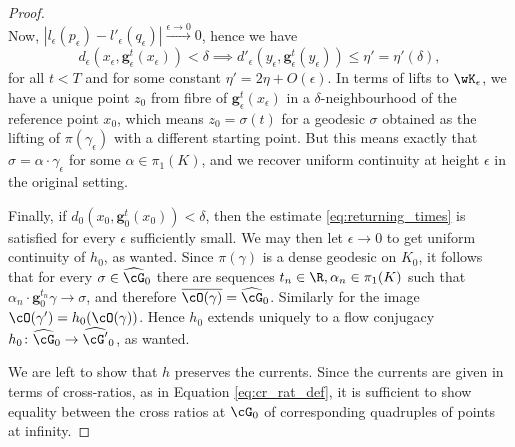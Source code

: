 \documentclass[reqno,11pt]{amsart}
\begin{document}
\begin{proof}
\[\]
Now, \(|l_\epsilon(p_\epsilon) - l'_\epsilon(q_\epsilon)| \xrightarrow{\epsilon \to 0} 0\), hence we have 
\[
    d_\epsilon(x_\epsilon, \mathbf{g}^t_\epsilon(x_\epsilon)) < \delta \implies d'_\epsilon(y_\epsilon, \mathbf{g}^t_\epsilon(y_\epsilon)) \leq \eta' = \eta'(\delta),
\]
for all \(t < T\) and for some constant \(\eta'= 2\eta + O(\epsilon)\).
In terms of lifts to \(\wK_\epsilon\), we have a unique point \(z_0\) from fibre of \(\mathbf{g}^t_\epsilon(x_\epsilon)\) in a \(\delta\)-neighbourhood of the reference point \(x_0\), which means \(z_0 = \sigma(t)\) for a geodesic \(\sigma\) obtained as the lifting of \(\pi(\gamma_\epsilon)\) with a different starting point.
But this means exactly that \(\sigma = \alpha\cdot\gamma_\epsilon\) for some \(\alpha \in \pi_1(K)\), and we recover uniform continuity at height \(\epsilon\) in the original setting.
\par Finally, if \(d_0(x_0, \mathbf{g}_0^t(x_0)) < \delta\), then the estimate \eqref{eq:returning_times} is satisfied for every \(\epsilon\) sufficiently small.
We may then let \(\epsilon \to 0\) to get uniform continuity of \(h_0\), as wanted.
Since \(\pi(\gamma)\) is a dense geodesic on \(K_0\), it follows that for every \(\sigma \in \widehat{\cG}_0\) there are sequences \(t_n \in \R, \alpha_n \in \pi_1(K)\) such that \(\alpha_n\cdot\mathbf{g}_0^{t_n}\gamma \to \sigma\), and therefore \(\overline{\cO(\gamma)} = \widehat{\cG}_0\).
Similarly for the image \(\cO(\gamma') = h_0(\cO(\gamma))\).
Hence \(h_0\) extends uniquely to a flow conjugacy \(h_0\colon \widehat{\cG}_0 \to \widehat{\cG'}_0\), as wanted.

\par We are left to show that \(h\) preserves the currents.
Since the currents are given in terms of cross-ratios, as in Equation \eqref{eq:cr_rat_def}, it is sufficient to show equality between the cross ratios at \(\cG_0\) of corresponding quadruples of points at infinity.


\end{proof}
\end{document}
